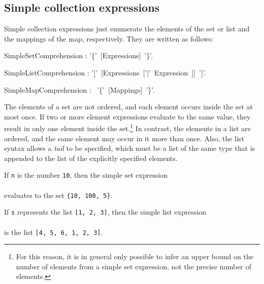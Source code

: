 \subsection{Simple collection expressions}



Simple collection expressions just enumerate the elements of the set
or list and the mappings of the map, respectively. They are written as
follows:



\index{-\charMore@{\tt ->}}

\bgr
SimpleSetComprehension : '\{'~[Expressions]~'\}'.

SimpleListComprehension : '['~[Expressions~['$\mid$'~Expression~]]~']'.

SimpleMapComprehension : \kwMap~'\{'~[Mappings]~'\}'.
\egr

The elements of a set are not ordered, and each element occurs inside
the set at most once. If two or more element expressions evaluate to
the same value, they result in only one element inside the
set.\footnote{For this reason, it is in general only possible to infer
  an upper bound on the number of elements from a simple set
  expression, not the precise number of elements.} In contrast, the
elements in a list are ordered, and the same element may occur in it
more than once. Also, the list syntax allows a {\em tail} to be
specified, which must be a list of the same type that is appended to
the list of the explicitly specified elements.

\begin{example}
  If {\tt n} is the number {\tt 10}, then the simple set expression\\
  \\ 
  evaluates to the set {\tt \{10, 100, 5\}}.

  If {\tt s} represents the list {\tt [1, 2, 3]}, then
  the simple list expression\\
 \exindent{\tt [4, 5, 6 | s]}\\
 is the list {\tt [4,
    5, 6, 1, 2, 3]}.
\end{example}

